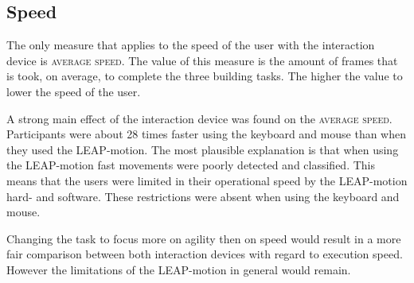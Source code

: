 \subsection{Speed}

The only measure that applies to the speed of the user with the interaction device is \textsc{average speed}. The value of this measure is the amount of frames that is took, on average, to complete the three building tasks. The higher the value to lower the speed of the user. 

A strong main effect of the interaction device was found on the \textsc{average speed}. Participants were about 28 times faster using the keyboard and mouse than when they used the LEAP-motion. The most plausible explanation is that when using the LEAP-motion fast movements were poorly detected and classified. This means that the users were limited in their operational speed by the LEAP-motion hard- and software. These restrictions were absent when using the keyboard and mouse. 

Changing the task to focus more on agility then on speed would result in a more fair comparison between both interaction devices with regard to execution speed. However the limitations of the LEAP-motion in general would remain. 
